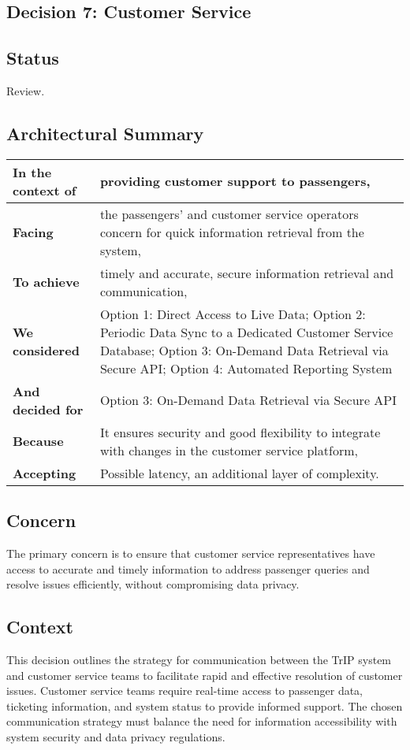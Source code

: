 \subsection{Decision 7: Customer Service}

\subsection*{Status}
Review.

\subsection*{Architectural Summary}
\begin{tabular}{|p{3.5cm}|p{10.5cm}|}
    \hline
    \textbf{In the context of} & providing customer support to passengers, \\
    \hline
    \textbf{Facing} & the passengers' and customer service operators concern for quick information retrieval from the system, \\
    \hline
    \textbf{To achieve} & timely and accurate, secure information retrieval and communication, \\
    \hline
    \textbf{We considered} & Option 1: Direct Access to Live Data; Option 2: Periodic Data Sync to a Dedicated Customer Service Database; Option 3: On-Demand Data Retrieval via Secure API; Option 4: Automated Reporting System\\
    \hline
    \textbf{And decided for} & Option 3: On-Demand Data Retrieval via Secure API \\
    \hline
    \textbf{Because} & It ensures security and good flexibility to integrate with changes in the customer service platform, \\
    \hline
    \textbf{Accepting} & Possible latency, an additional layer of complexity. \\
    \hline
\end{tabular}

\subsection*{Concern}
The primary concern is to ensure that customer service representatives have access to accurate and timely information to address passenger queries and resolve issues efficiently, without compromising data privacy.

\subsection*{Context}
This decision outlines the strategy for communication between the TrIP system and customer service teams to facilitate rapid and effective resolution of customer issues. Customer service teams require real-time access to passenger data, ticketing information, and system status to provide informed support. The chosen communication strategy must balance the need for information accessibility with system security and data privacy regulations.

